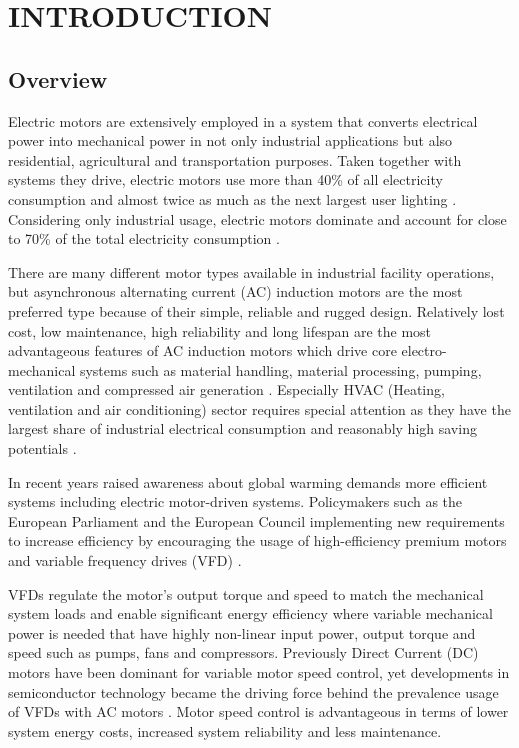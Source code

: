 \chapter{INTRODUCTION}\label{Ch1}
\section{Overview}
\label{overvıew}

Electric motors are extensively employed in a system that converts electrical power into mechanical power in not only industrial applications but also residential, agricultural and transportation purposes. Taken together with systems they drive, electric motors use more than 40\% of all electricity consumption and almost twice as much as the next largest user lighting \cite{waide2011energy}. Considering only industrial usage, electric motors dominate and account for close to 70\% of the total electricity consumption \cite{waide2011energy,kulterer2014policy}.

There are many different motor types available in industrial facility operations, but asynchronous alternating current (AC) induction motors are the most preferred type because of their simple, reliable and rugged design. Relatively lost cost, low maintenance, high reliability and long lifespan are the most advantageous features of AC induction motors which drive core electro-mechanical systems such as material handling, material processing, pumping, ventilation and compressed air generation \cite{Fleiter2012EnergyEI}. Especially HVAC (Heating, ventilation and air conditioning) sector requires special attention as they have the largest share of industrial electrical consumption and reasonably high saving potentials \cite{Fleiter2012EnergyEI}.

In recent years raised awareness about global warming demands more efficient systems including electric motor-driven systems. Policymakers such as the European Parliament and the European Council implementing new requirements to increase efficiency by encouraging the usage of high-efficiency premium motors and variable frequency drives (VFD) \cite{kulterer2014policy,mikami2011historical}.

VFDs regulate the motor's output torque and speed to match the mechanical system loads and enable significant energy efficiency where variable mechanical power is needed that have highly non-linear input power, output torque and speed such as pumps, fans and compressors. Previously Direct Current (DC) motors have been dominant for variable motor speed control, yet developments in semiconductor technology became the driving force behind the prevalence usage of VFDs with AC motors \cite{doe2008improving}. Motor speed control is advantageous in terms of lower system energy costs, increased system reliability and less maintenance.  

